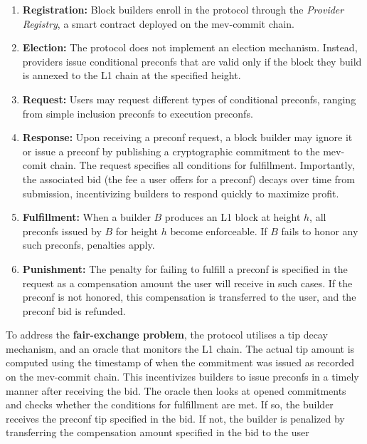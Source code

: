 \documentclass[a4paper]{article}
\theoremstyle{boldstyle}
\begin{document}
\begin{enumerate}
    \item \textbf{Registration:} Block builders enroll in the protocol through the \emph{Provider Registry}, a smart contract deployed on the mev-commit chain.

    \item \textbf{Election:} The protocol does not implement an election mechanism. Instead, providers issue conditional preconfs that are valid only if the block they build is annexed to the L1 chain at the specified height.

    \item \textbf{Request:} Users may request different types of conditional preconfs, ranging from simple inclusion preconfs to execution preconfs.

    \item \textbf{Response:} Upon receiving a preconf request, a block builder may ignore it or issue a preconf by publishing a cryptographic commitment to the mev-comit chain. The request specifies all conditions for fulfillment. Importantly, the associated bid (the fee a user offers for a preconf) decays over time from submission, incentivizing builders to respond quickly to maximize profit.

    \item \textbf{Fulfillment:} When a builder $B$ produces an L1 block at height $h$, all preconfs issued by $B$ for height $h$ become enforceable. If $B$ fails to honor any such preconfs, penalties apply.

    \item \textbf{Punishment:} The penalty for failing to fulfill a preconf is specified in the request as a compensation amount the user will receive in such cases. If the preconf is not honored, this compensation is transferred to the user, and the preconf bid is refunded.
\end{enumerate}

     To address the \textbf{fair-exchange problem}, the protocol utilises a tip decay mechanism, and an oracle that monitors the L1 chain. The actual tip amount is computed using the timestamp of when the commitment was issued as recorded on the mev-commit chain. This incentivizes builders to issue preconfs in a timely manner after receiving the bid. The oracle then looks at opened commitments and checks whether the conditions for fulfillment are met. If so, the builder receives the preconf tip specified in the bid. If not, the builder is penalized by transferring the compensation amount specified in the bid to the user
\end{document}
